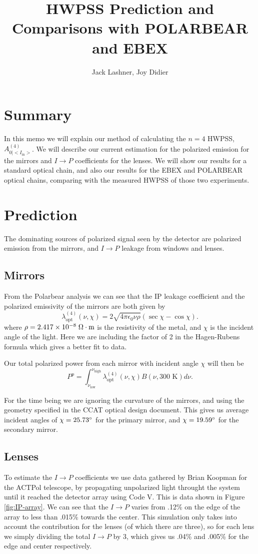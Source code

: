 \documentclass{article}
\title{HWPSS Prediction and Comparisons with POLARBEAR and EBEX}
\author{Jack Lashner, Joy Didier}
\theoremstyle{remark}
\newcommand{\tab}{\hspace*{2em}}
\renewcommand{\t}[1]{\text{#1}}
\newcommand{\AI}{A^{(4)}_{0|<I_{\t{in}}>}}
\newcommand{\lo}{\lambda_\t{opt}^{(4)}}
\newcommand{\ip}{$I\rightarrow P$ }
\begin{document}
\maketitle
\section*{Summary}
\tab In this memo we will explain our method of calculating the $n=4$ HWPSS, $\AI$. 
We will describe our current estimation for the polarized emission for the mirrors and $I\rightarrow P$ coefficients for the lenses. 
We will show our results for a standard optical chain, and also our results for the EBEX and POLARBEAR optical chains,
comparing with the measured HWPSS of those two experiments. 
\section*{Prediction}
\tab The dominating sources of polarized signal seen by the detector are polarized emission from the mirrors, and $I\rightarrow P$ leakage from windows and lenses.

\subsection*{Mirrors}
\tab From the Polarbear analysis \cite{takakura_performance_2017}  we can see that the IP leakage coefficient and the polarized emissivity of the mirrors are both given by
\[\lo(\nu, \chi) = 2 \sqrt{4 \pi \epsilon_0 \nu \rho} (\sec\chi - \cos\chi).\]
where $\rho = 2.417\times 10^{-8} \; \ohm \cdot \t{m}$ is the resistivity of the metal, and $\chi$ is the incident angle of the light.
Here we are including the factor of 2 in the Hagen-Rubens formula which gives a better fit to data.

\tab Our total polarized power from each mirror with incident angle $\chi$ will then be
\[
P^{p} = \int_{\nu_\t{low}}^{\nu_\t{high}} \lo(\nu, \chi) B(\nu, 300 \t{ K}) d\nu.
\]


\tab For the time being we are ignoring the curvature of the mirrors, and using the geometry specified in the CCAT optical design document.
This gives us average incident angles of $\chi = 25.73 \degree$ for the primary mirror, and $\chi = 19.59\degree$ for the secondary mirror.
\subsection*{Lenses}
\tab To estimate the $I\rightarrow P$ coefficients we use data gathered by Brian Koopman for the ACTPol telescope, by propagating unpolarized light throught the system until it reached the detector array using Code V. 
This is data shown in Figure \ref{fig:IP-array}. 
We can see that the \ip varies from .12\% on the edge of the array to less than .015\% towards the center.
This simulation only takes into account the contribution for the lenses (of which there are three), so for each lens we simply dividing the total \ip by 3, which gives us .04\% and .005\% for the edge and center respectively.
\end{document}
